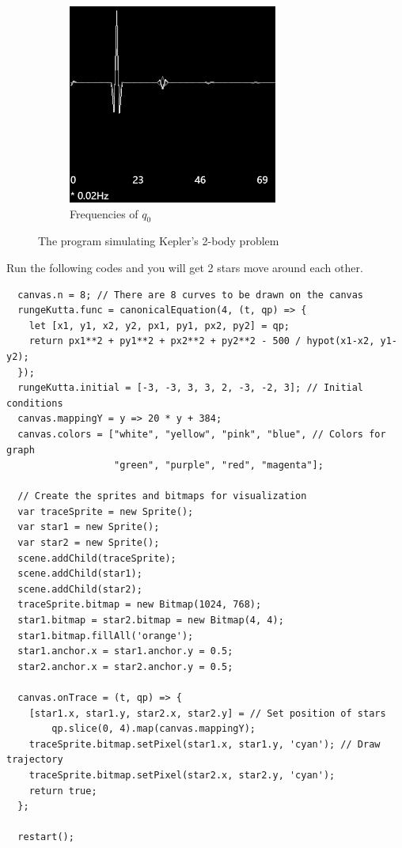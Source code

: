 \documentclass[12pt]{article}
\begin{document}
\begin{figure}[h]
\begin{subfigure}[b]{0.2\linewidth}
    \includegraphics[width=\linewidth]{kepler_2_body_q0_frequencies.png}
    \caption{Frequencies of $q_0$}
  \end{subfigure}
  \caption{The program simulating Kepler's 2-body problem}
  \label{fig:kepler}
\end{figure}

Run the following codes and you will get 2 stars move around each other.

\begin{verbatim}
  canvas.n = 8; // There are 8 curves to be drawn on the canvas
  rungeKutta.func = canonicalEquation(4, (t, qp) => {
    let [x1, y1, x2, y2, px1, py1, px2, py2] = qp;
    return px1**2 + py1**2 + px2**2 + py2**2 - 500 / hypot(x1-x2, y1-y2);
  });
  rungeKutta.initial = [-3, -3, 3, 3, 2, -3, -2, 3]; // Initial conditions
  canvas.mappingY = y => 20 * y + 384;
  canvas.colors = ["white", "yellow", "pink", "blue", // Colors for graph
                   "green", "purple", "red", "magenta"];

  // Create the sprites and bitmaps for visualization
  var traceSprite = new Sprite();
  var star1 = new Sprite();
  var star2 = new Sprite();
  scene.addChild(traceSprite);
  scene.addChild(star1);
  scene.addChild(star2);
  traceSprite.bitmap = new Bitmap(1024, 768);
  star1.bitmap = star2.bitmap = new Bitmap(4, 4);
  star1.bitmap.fillAll('orange');
  star1.anchor.x = star1.anchor.y = 0.5;
  star2.anchor.x = star2.anchor.y = 0.5;

  canvas.onTrace = (t, qp) => {
    [star1.x, star1.y, star2.x, star2.y] = // Set position of stars
        qp.slice(0, 4).map(canvas.mappingY);
    traceSprite.bitmap.setPixel(star1.x, star1.y, 'cyan'); // Draw trajectory
    traceSprite.bitmap.setPixel(star2.x, star2.y, 'cyan');
    return true;
  };

  restart();
\end{verbatim}
\end{document}
